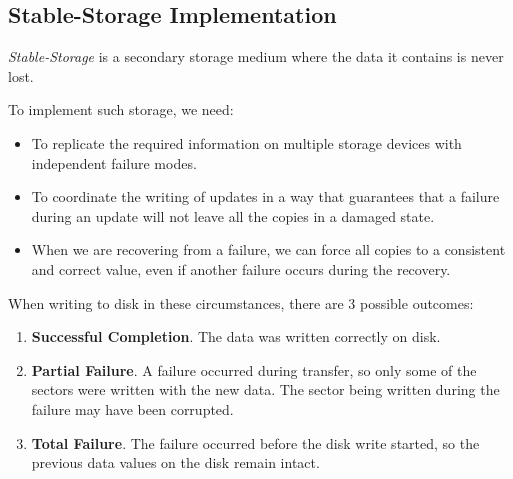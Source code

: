 \subsection{Stable-Storage Implementation}\label{subsec:Stable_Storage_Implementation}
\begin{definition}\label{def:Stable_Storage}
  \emph{Stable-Storage} is a secondary storage medium where the data it contains is never lost.
\end{definition}

To implement such storage, we need:
\begin{itemize}[noitemsep]
\item To replicate the required information on multiple storage devices with independent failure modes.
\item To coordinate the writing of updates in a way that guarantees that a failure during an update will not leave all the copies in a damaged state.
\item When we are recovering from a failure, we can force all copies to a consistent and correct value, even if another failure occurs during the recovery.
\end{itemize}

When writing to disk in these circumstances, there are 3 possible outcomes:
\begin{enumerate}[noitemsep]
\item \textbf{Successful Completion}.
  The data was written correctly on disk.
\item \textbf{Partial Failure}.
  A failure occurred during transfer, so only some of the sectors were written with the new data.
  The sector being written during the failure may have been corrupted.
\item \textbf{Total Failure}.
  The failure occurred before the disk write started, so the previous data values on the disk remain intact.
\end{enumerate}


